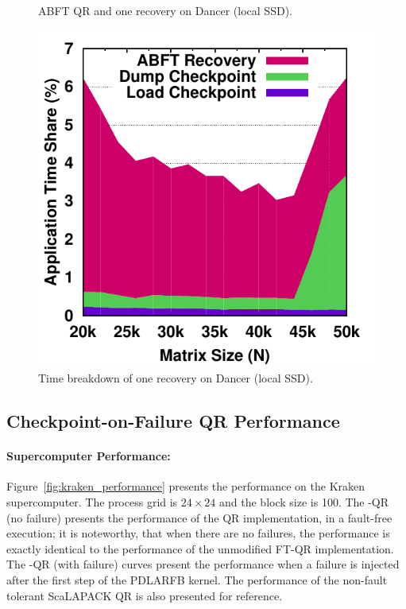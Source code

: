 \begin{figure}[thb]
\begin{minipage}[t]{.29\linewidth}
	\vspace{-.6cm}\caption{ABFT QR and one \cof recovery on Dancer (local SSD).} %
    \label{fig:dancer_performance}
\end{minipage}
\hfill
\begin{minipage}[t]{.29\linewidth}
    \includegraphics[width=\linewidth]{figures/dancer_1_error_timing_process_new_data}
	\vspace{-.6cm}\caption{Time breakdown of one \cof recovery on Dancer (local SSD).}
    \label{fig:dancer_timing}
\end{minipage}\vspace{-.3cm}
\end{figure}

\subsection{Checkpoint-on-Failure QR Performance}

\paragraph*{Supercomputer Performance:}
Figure~\ref{fig:kraken_performance} presents the performance on the
Kraken supercomputer. The process grid is $24\times 24$ and the block size
is 100. The \cof-QR (no failure) presents the performance of the \cof QR
implementation, in a fault-free execution; it is noteworthy, that when
there are no failures, the performance is exactly identical to the
performance of the unmodified FT-QR implementation. The \cof-QR (with
failure) curves present the performance when a failure is injected after
the first step of the PDLARFB kernel. The performance of the non-fault
tolerant ScaLAPACK QR is also presented for reference.

